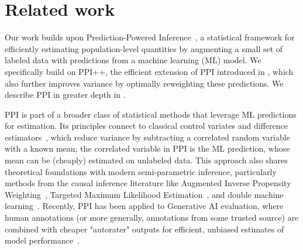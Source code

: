 \documentclass{article} %
\renewcommand{\cite}{\citep}
\newcommand{\amirg}[1]{ {\color{green}[AG: #1]}}
\begin{document}
\section{Related work}

Our work builds upon  Prediction-Powered Inference~\cite[PPI;][]{angelopoulos2023prediction}, a statistical framework for efficiently estimating population-level quantities by augmenting a small set of labeled data with predictions from a machine learning (ML) model. We specifically build on PPI{++}, the efficient extension of PPI introduced in \citet{angelopoulos2023ppi++}, which also further improves variance by optimally reweighting these predictions. We describe PPI in greater depth in .


PPI is part of a broader class of statistical methods that leverage ML predictions for estimation. Its principles connect to classical control variates and difference estimators~\cite{Ripley87, model1992sarndal, chaganty-etal-2018-price}, which reduce  variance by subtracting a correlated random variable with a known mean; the correlated variable in PPI is the ML prediction, whose mean can be (cheaply) estimated on unlabeled data. This approach also shares theoretical foundations with modern semi-parametric  inference, particularly methods from the causal inference literature like Augmented Inverse Propensity Weighting~\cite[AIPW;][]{aipw_robins}, Targeted Maximum Likelihood Estimation~\cite[TMLE;][]{vanderLaan2006tmle}, and double  machine learning~\cite[DML;][]{chernozhukov2018dml}. Recently, PPI has been applied to  Generative AI evaluation, where human annotations (or more generally, annotations from some trusted source) are combined with cheaper "autorater" outputs for efficient, unbiased estimates of model performance~\cite{boyeau2024autoeval, chatzi2024ppirank, fisch2024stratified,angelopoulos2025costoptimalactiveaimodel, saad-falcon-etal-2024-ares, demirel2024prediction}.
\end{document}
